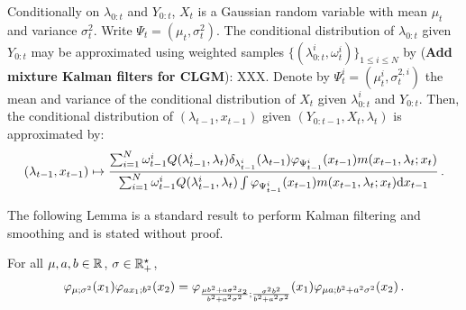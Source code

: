 Conditionally on $\lambda_{0:t}$ and $Y_{0:t}$, $X_t$ is a Gaussian random variable with mean $\mu_t$ and variance $\sigma^2_t$.  Write $\Psi_t = (\mu_t,\sigma^2_t)$. The conditional distribution of $\lambda_{0:t}$ given $Y_{0:t}$ may be approximated using weighted samples $\{(\lambda^i_{0:t},\omega_t^i)\}_{1\le i \le N}$ by ({\bf Add mixture Kalman filters for CLGM}): XXX. Denote by $\Psi^i_t = (\mu^i_t,\sigma^{2,i}_t)$ the mean and variance of the conditional distribution of $X_{t}$ given $\lambda^i_{0:t}$ and $Y_{0:t}$. Then, the conditional distribution of $(\lambda_{t-1},x_{t-1})$ given $(Y_{0:t-1},X_t,\lambda_t)$ is approximated by:
\[
(\lambda_{t-1},x_{t-1})\mapsto\frac{\sum_{i=1}^N\omega_{t-1}^i Q(\lambda^i_{t-1},\lambda_t)\delta_{\lambda^i_{t-1}}(\lambda_{t-1})\varphi_{\Psi^i_{t-1}}(x_{t-1})m(x_{t-1},\lambda_t;x_t)}{\sum_{i=1}^N\omega_{t-1}^i Q(\lambda^i_{t-1},\lambda_t)\int\varphi_{\Psi^i_{t-1}}(x_{t-1})m(x_{t-1},\lambda_t;x_t)\mathrm{d} x_{t-1}}\,.
\]

The following Lemma is a standard result to perform Kalman filtering and smoothing and is stated without proof.
\begin{lemma}
\label{lem:kalma:update}
For all $\mu,a,b\in\mathbb{R}$, $\sigma\in\mathbb{R}_+^{\star}$,
\[
\varphi_{\mu;\sigma^2}(x_1)\varphi_{ax_1;b^2}(x_2) = \varphi_{\frac{\mu b^2 + a\sigma^2x_2}{b^2+a^2\sigma^2};\frac{\sigma^2b^2}{b^2+a^2\sigma^2}}(x_1)\varphi_{\mu a;b^2+a^2\sigma^2}(x_2)\,.
\]
\end{lemma}